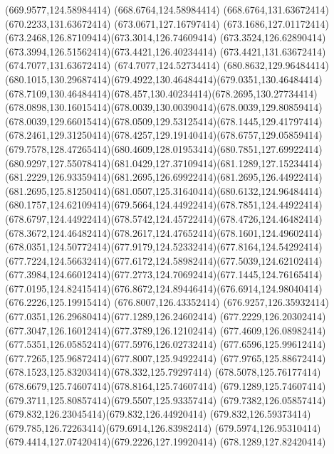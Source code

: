 {{	\lineto(669.9577,124.58984414)
	\lineto(668.6764,124.58984414)
	\lineto(668.6764,131.63672414)
	\lineto(670.2233,131.63672414)
	\lineto(673.0671,127.16797414)
	\curveto(673.1686,127.01172414)(673.2468,126.87109414)(673.3014,126.74609414)
	\curveto(673.3524,126.62890414)(673.3994,126.51562414)(673.4421,126.40234414)
	\lineto(673.4421,131.63672414)
	\lineto(674.7077,131.63672414)
	\lineto(674.7077,124.52734414)
	\closepath
	\moveto(680.8632,129.96484414)
	\curveto(680.1015,130.29687414)(679.4922,130.46484414)(679.0351,130.46484414)
	\curveto(678.7109,130.46484414)(678.457,130.40234414)(678.2695,130.27734414)
	\curveto(678.0898,130.16015414)(678.0039,130.00390414)(678.0039,129.80859414)
	\curveto(678.0039,129.66015414)(678.0509,129.53125414)(678.1445,129.41797414)
	\curveto(678.2461,129.31250414)(678.4257,129.19140414)(678.6757,129.05859414)
	\curveto(679.7578,128.47265414)(680.4609,128.01953414)(680.7851,127.69922414)
	\curveto(680.9297,127.55078414)(681.0429,127.37109414)(681.1289,127.15234414)
	\curveto(681.2229,126.93359414)(681.2695,126.69922414)(681.2695,126.44922414)
	\curveto(681.2695,125.81250414)(681.0507,125.31640414)(680.6132,124.96484414)
	\curveto(680.1757,124.62109414)(679.5664,124.44922414)(678.7851,124.44922414)
	\curveto(678.6797,124.44922414)(678.5742,124.45722414)(678.4726,124.46482414)
	\curveto(678.3672,124.46482414)(678.2617,124.47652414)(678.1601,124.49602414)
	\curveto(678.0351,124.50772414)(677.9179,124.52332414)(677.8164,124.54292414)
	\curveto(677.7224,124.56632414)(677.6172,124.58982414)(677.5039,124.62102414)
	\curveto(677.3984,124.66012414)(677.2773,124.70692414)(677.1445,124.76165414)
	\curveto(677.0195,124.82415414)(676.8672,124.89446414)(676.6914,124.98040414)
	\lineto(676.2226,125.19915414)
	\lineto(676.8007,126.43352414)
	\curveto(676.9257,126.35932414)(677.0351,126.29680414)(677.1289,126.24602414)
	\curveto(677.2229,126.20302414)(677.3047,126.16012414)(677.3789,126.12102414)
	\curveto(677.4609,126.08982414)(677.5351,126.05852414)(677.5976,126.02732414)
	\curveto(677.6596,125.99612414)(677.7265,125.96872414)(677.8007,125.94922414)
	\curveto(677.9765,125.88672414)(678.1523,125.83203414)(678.332,125.79297414)
	\curveto(678.5078,125.76177414)(678.6679,125.74607414)(678.8164,125.74607414)
	\curveto(679.1289,125.74607414)(679.3711,125.80857414)(679.5507,125.93357414)
	\curveto(679.7382,126.05857414)(679.832,126.23045414)(679.832,126.44920414)
	\curveto(679.832,126.59373414)(679.785,126.72263414)(679.6914,126.83982414)
	\curveto(679.5974,126.95310414)(679.4414,127.07420414)(679.2226,127.19920414)
	\lineto(678.1289,127.82420414)
}}
